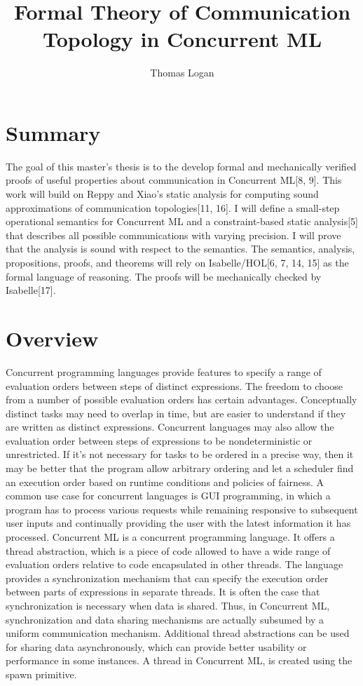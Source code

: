 \documentclass{article}
\title{Formal Theory of Communication Topology in Concurrent ML}
\author{Thomas Logan}
\begin{document}
\maketitle
{}

\newpage
{}


\section{Summary}
The goal of this master's thesis is to the develop formal and mechanically verified proofs of
useful properties about communication in Concurrent ML[8, 9].  This work will build on Reppy
and Xiao's static analysis for computing sound approximations of communication
topologies[11, 16].  I will define a small-step operational semantics for Concurrent ML and a
constraint-based static analysis[5] that describes all possible communications with varying
precision.  I will prove that the analysis is sound with respect to the semantics.  The
semantics, analysis, propositions, proofs, and theorems will rely on Isabelle/HOL[6, 7, 14, 15]
as the formal language of reasoning.  The proofs will be mechanically checked by Isabelle[17].


\section{Overview}
Concurrent programming languages provide features to specify a range of evaluation orders
between steps of distinct expressions.  The freedom to choose from a number of possible
evaluation orders has certain advantages.  Conceptually distinct tasks may need to overlap in
time, but are easier to understand if they are written as distinct expressions.  Concurrent
languages may also allow the evaluation order between steps of expressions to be
nondeterministic or unrestricted.  If it's not necessary for tasks to be ordered in a precise
way, then it may be better that the program allow arbitrary ordering and let a scheduler find
an execution order based on runtime conditions and policies of fairness.  A common use case for
concurrent languages is GUI programming, in which a program has to process various requests
while remaining responsive to subsequent user inputs and continually providing the user with
the latest information it has processed. Concurrent ML is a concurrent programming language.
It offers a thread abstraction, which is a piece of code allowed to have a wide range of
evaluation orders relative to code encapsulated in other threads.  The language provides a
synchronization mechanism that can specify the execution order between parts of expressions in
separate threads.  It is often the case that synchronization is necessary when data is shared.
Thus, in Concurrent ML, synchronization and data sharing mechanisms are actually subsumed by a
uniform communication mechanism.  Additional thread abstractions can be used for sharing data
asynchronously, which can provide better usability or performance in some instances. A thread
in Concurrent ML, is created using the spawn primitive.
\end{document}
